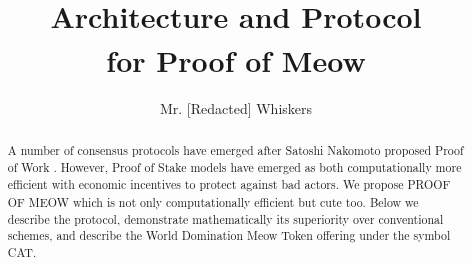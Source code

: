 \documentclass[9pt,oneside]{amsart}
\title{\RNum{2020} \compu{} \\ Architecture and Protocol\\ for Proof of Meow\textsuperscript{\textregistered}\\ {\smaller{\textbf{(Draft 1.0.5)}}}}
\author{Mr. [Redacted] Whiskers}
\newcommand*\proofmeow{PROOF OF MEOW\textsuperscript{\textregistered}}
\begin{document}
\begin{abstract}
 A number of consensus protocols have emerged after Satoshi Nakomoto proposed Proof of Work \cite{nakamoto2009bitcoin}. However, Proof of Stake models have emerged as both computationally more efficient with economic incentives to protect against bad actors. We propose \proofmeow{} which is not only computationally efficient but cute too. Below we describe the protocol, demonstrate mathematically its superiority over conventional schemes, and describe the World Domination Meow Token offering under the symbol CAT.
\end{abstract}

\maketitle
\end{document}
